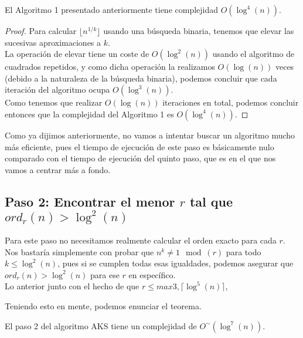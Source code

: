 \begin{teorema}
	El Algoritmo 1 presentado anteriormente tiene complejidad $O(\log^4(n))$.
\end{teorema}

\begin{proof}
	Para calcular $\lfloor n^{1/k} \rfloor$ usando una búsqueda binaria, tenemos que elevar las sucesivas aproximaciones a $k$.\\
	
	La operación de elevar tiene un coste de $O(\log^2(n))$ usando el algoritmo de cuadrados repetidos, y como dicha operación la realizamos $O(\log(n))$ veces (debido a la naturaleza de la búsqueda binaria), podemos concluir que cada iteración del algoritmo ocupa $O(\log^3(n))$.\\
	
	Como tenemos que realizar $O(\log(n))$ iteraciones en total, podemos concluir entonces que la complejidad del Algoritmo 1 es $O(\log^4(n))$.
\end{proof}

Como ya dijimos anteriormente, no vamos a intentar buscar un algoritmo mucho más eficiente, pues el tiempo de ejecución de este paso es básicamente nulo comparado con el tiempo de ejecución del quinto paso, que es en el que nos vamos a centrar más a fondo.

\subsection{Paso 2: Encontrar el menor $r$ tal que $ord_r(n) > \log^2(n)$}

Para este paso no necesitamos realmente calcular el orden exacto para cada $r$. Nos bastaría simplemente con probar que $n^k \neq 1 \mod(r)$ para todo $k \leq \log^2(n)$, pues si se cumplen todas esas igualdades, podemos asegurar que $ord_r(n) > \log^2(n)$ para ese $r$ en específico.\\

Lo anterior junto con el hecho de que $r \leq max{3, \lceil \log^5(n) \rceil}$,

Teniendo esto en mente, podemos enunciar el teorema.

\begin{teorema}
	El paso 2 del algoritmo AKS tiene un complejidad de $O^\sim(\log^7(n))$.
\end{teorema}

